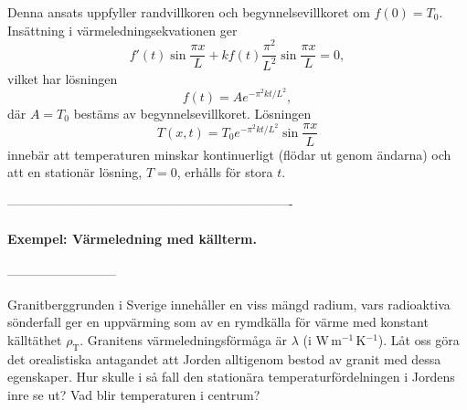 \documentclass[%
oneside,                 %
final,                   %
10pt]{article}
\begin{document}
Denna ansats uppfyller randvillkoren och begynnelsevillkoret om $f(0) = T_0$. Insättning i värmeledningsekvationen ger
$$
f'(t) \sin \frac{\pi x}{L} + k f(t) \frac{\pi^2}{L^2} \sin \frac{\pi x}{L} = 0,
$$
vilket har lösningen
$$
f(t) = A e^{-\pi^2 k t / L^2},
$$
där $A = T_0$ bestäms av begynnelsevillkoret. Lösningen 
$$
T(x,t) = T_0 e^{-\pi^2 k t / L^2} \sin \frac{\pi x}{L}
$$
innebär att temperaturen minskar kontinuerligt (flödar ut genom ändarna) och att en stationär lösning, $T=0$, erhålls för stora $t$.

-------------------------------------------------------------------

\paragraph{Exempel: Värmeledning med källterm.}
--------------------------

Granitberggrunden i Sverige innehåller en viss mängd
radium, vars radioaktiva sönderfall ger en uppvärming som av en rymdkälla
för värme med konstant källtäthet $\rho_\mathrm{T}$.  Granitens 
värmeledningsförmåga är $\lambda$ (i W\,m$^{-1}$\,K$^{-1}$).  Låt
oss göra det orealistiska antagandet att Jorden alltigenom bestod av granit
med dessa egenskaper.  Hur skulle i så fall den stationära 
temperaturfördelningen i Jordens inre se ut?  Vad blir temperaturen i 
centrum?
\end{document}
